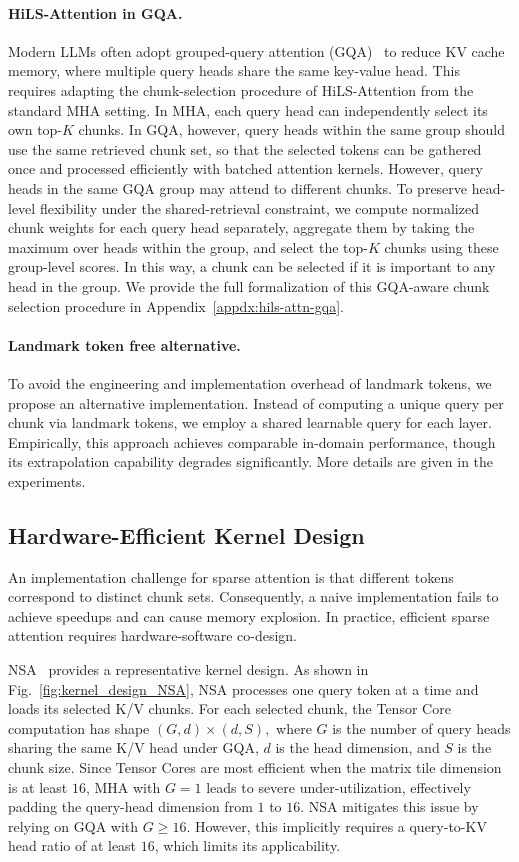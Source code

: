 \paragraph{HiLS-Attention in GQA.} 
Modern LLMs often adopt grouped-query attention (GQA)~\cite{ainslie-etal-2023-gqa} to reduce KV cache memory, 
where multiple query heads share the same key-value head. This requires adapting the chunk-selection procedure of HiLS-Attention from the standard MHA setting. In MHA, each query head can independently select its own top-$K$ chunks. In GQA, however, query heads within the same group should use the same retrieved chunk set, so that the selected tokens can be gathered once and processed efficiently with batched attention kernels. However, query heads in the same GQA group may attend to different chunks. To preserve head-level flexibility under the shared-retrieval constraint, we compute normalized chunk weights for each query head separately, aggregate them by taking the maximum over heads within the group, and select the top-$K$ chunks using these group-level scores. In this way, a chunk can be selected if it is important to any head in the group. We provide the full formalization of this GQA-aware chunk selection procedure in Appendix~\ref{appdx:hils-attn-gqa}.

\paragraph{Landmark token free alternative.} To avoid the engineering and implementation overhead of landmark tokens, we propose an alternative implementation. Instead of computing a unique query per chunk via landmark tokens, we employ a shared learnable query for each layer. Empirically, this approach achieves comparable in-domain performance, though its extrapolation capability degrades significantly. More details are given in the experiments. 


\subsection{Hardware-Efficient Kernel Design}
An implementation challenge for sparse attention is that different tokens correspond to distinct chunk sets. Consequently, a naive implementation fails to achieve speedups and can cause memory explosion. In practice, efficient sparse attention requires hardware-software co-design.

NSA~\cite{yuan-etal-2025-native} provides a representative kernel design. As shown in Fig.~\ref{fig:kernel_design_NSA}, NSA processes one query token at a time and loads its selected K/V chunks. For each selected chunk, the Tensor Core computation has shape $(G,d)\times(d,S),$
where $G$ is the number of query heads sharing the same K/V head under GQA, $d$ is the head dimension, and $S$ is the chunk size. Since Tensor Cores are most efficient when the matrix tile dimension is at least $16$, MHA with $G=1$ leads to severe under-utilization, effectively padding the query-head dimension from $1$ to $16$. NSA mitigates this issue by relying on GQA with $G\geq16$. However, this implicitly requires a query-to-KV head ratio of at least $16$, which limits its applicability.


